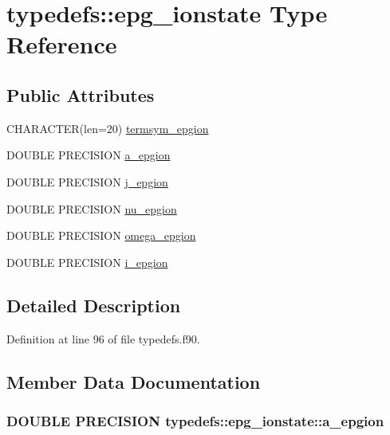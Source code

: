 \hypertarget{typetypedefs_1_1epg__ionstate}{
\section{typedefs::epg\_\-ionstate Type Reference}
\label{typetypedefs_1_1epg__ionstate}
}
\subsection*{Public Attributes}
\begin{DoxyCompactItemize}
\item 
CHARACTER(len=20) \hyperlink{typetypedefs_1_1epg__ionstate_ab4319012611e6467da11e7c374dda89c}{termsym\_\-epgion}
\item 
DOUBLE PRECISION \hyperlink{typetypedefs_1_1epg__ionstate_a26ebf9bef52002dee95c0cd61f39c784}{a\_\-epgion}
\item 
DOUBLE PRECISION \hyperlink{typetypedefs_1_1epg__ionstate_af58a6a50862ca7fa102f7cfb4fbfa048}{j\_\-epgion}
\item 
DOUBLE PRECISION \hyperlink{typetypedefs_1_1epg__ionstate_a223a1bee73dd96f76979196b8eced4ff}{nu\_\-epgion}
\item 
DOUBLE PRECISION \hyperlink{typetypedefs_1_1epg__ionstate_a83358e3fa4910f5d22f255d17ac27210}{omega\_\-epgion}
\item 
DOUBLE PRECISION \hyperlink{typetypedefs_1_1epg__ionstate_a6a8f71bd76a8bc224110dddd0879e737}{i\_\-epgion}
\end{DoxyCompactItemize}


\subsection{Detailed Description}


Definition at line 96 of file typedefs.f90.

\subsection{Member Data Documentation}
\hypertarget{typetypedefs_1_1epg__ionstate_a26ebf9bef52002dee95c0cd61f39c784}{
\subsubsection[{a\_\-epgion}]{\setlength{\rightskip}{0pt plus 5cm}DOUBLE PRECISION {\bf typedefs::epg\_\-ionstate::a\_\-epgion}}}
\label{typetypedefs_1_1epg__ionstate_a26ebf9bef52002dee95c0cd61f39c784}


